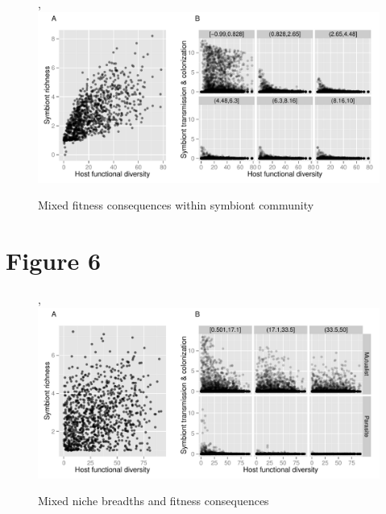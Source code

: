 \documentclass[12pt]{article}
\begin{document}
\begin{figure}[ht]\centering,
\includegraphics[width=\linewidth]{fig/fig5.pdf}
\caption{Mixed fitness consequences within symbiont community}
\label{fig:fig5}
\end{figure}

\newpage

\section*{Figure 6}

\begin{figure}[ht]\centering,
\includegraphics[width=\linewidth]{fig/fig6.pdf}
\caption{Mixed niche breadths and fitness consequences}
\label{fig:fig6}
\end{figure}
\end{document}
